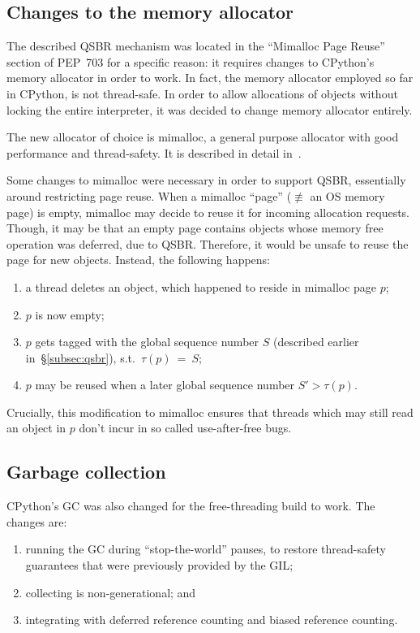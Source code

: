 \subsection{Changes to the memory allocator}\label{subsec:mimalloc}

The described QSBR mechanism was located in the ``Mimalloc Page Reuse'' section of PEP~703 for a specific reason: it requires changes to CPython's memory allocator in order to work.
In fact, the memory allocator employed so far in CPython, is not thread-safe.
In order to allow allocations of objects without locking the entire interpreter, it was decided to change memory allocator entirely.

The new allocator of choice is mimalloc, a general purpose allocator with good performance and thread-safety.
It is described in detail in~\cite{mimalloc}.

Some changes to mimalloc were necessary in order to support QSBR, essentially around restricting page reuse.
When a mimalloc ``page'' ($\not\equiv$ an OS memory page) is empty, mimalloc may decide to reuse it for incoming allocation requests.
Though, it may be that an empty page contains objects whose memory free operation was deferred, due to QSBR\@.
Therefore, it would be unsafe to reuse the page for new objects.
Instead, the following happens:
\begin{enumerate}
    \item a thread deletes an object, which happened to reside in mimalloc page $p$;
    \item $p$ is now empty;
    \item $p$ gets tagged with the global sequence number $S$ (described earlier in~\S\ref{subsec:qsbr}), s.t.\ $\tau(p)~=~S$;
    \item $p$ may be reused when a later global sequence number $S' > \tau(p)$.
\end{enumerate}

Crucially, this modification to mimalloc ensures that threads which may still read an object in $p$ don't incur in so called use-after-free bugs.


\subsection{Garbage collection}\label{subsec:python-gc}

CPython's GC was also changed for the free-threading build to work.
The changes are:
\begin{enumerate}
    \item running the GC during ``stop-the-world'' pauses, to restore thread-safety guarantees that were previously provided by the GIL;
    \item collecting is non-generational; and
    \item integrating with deferred reference counting and biased reference counting.
\end{enumerate}

